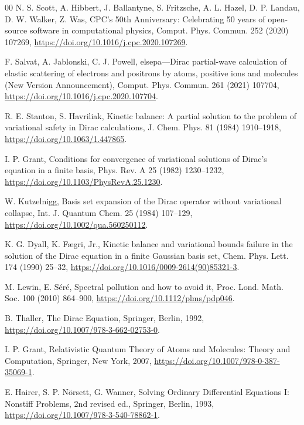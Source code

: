 \documentclass[a4paper,fleqn]{cas-dc}
\begin{document}
\begin{thebibliography}{00}
 N. S. Scott, A. Hibbert, J. Ballantyne, S. Fritzsche, A. L. Hazel, D. P. Landau, D. W. Walker, Z. Was, CPC's 50th Anniversary: Celebrating 50 years of open-source software in computational physics, Comput. Phys. Commun. 252 (2020) 107269, \url{https://doi.org/10.1016/j.cpc.2020.107269}.

 F. Salvat, A. Jablonski, C. J. Powell, elsepa---Dirac partial-wave calculation of elastic scattering of electrons and positrons by atoms, positive ions and molecules (New Version Announcement), Comput. Phys. Commun. 261 (2021) 107704, \url{https://doi.org/10.1016/j.cpc.2020.107704}.

 R. E. Stanton, S. Havriliak, Kinetic balance: A partial solution to the problem of variational safety in Dirac calculations, J. Chem. Phys. 81 (1984) 1910--1918, \url{https://doi.org/10.1063/1.447865}.

 I. P. Grant, Conditions for convergence of variational solutions of Dirac's equation in a finite basis, Phys. Rev. A 25 (1982) 1230--1232, \url{https://doi.org/10.1103/PhysRevA.25.1230}.

 W. Kutzelnigg, Basis set expansion of the Dirac operator without variational collapse, Int. J. Quantum Chem. 25 (1984) 107--129, \url{https://doi.org/10.1002/qua.560250112}.

 K. G. Dyall, K. F\ae gri, Jr., Kinetic balance and variational bounds failure in the solution of the Dirac equation in a finite Gaussian basis set, Chem. Phys. Lett. 174 (1990) 25--32, \url{https://doi.org/10.1016/0009-2614(90)85321-3}.

 M. Lewin, E. S\'er\'e, Spectral pollution and how to avoid it, Proc. Lond. Math. Soc. 100 (2010) 864--900, \url{https://doi.org/10.1112/plms/pdp046}.

 B. Thaller, The Dirac Equation, Springer, Berlin, 1992, \url{https://doi.org/10.1007/978-3-662-02753-0}.

 I. P. Grant, Relativistic Quantum Theory of Atoms and Molecules: Theory and Computation, Springer, New York, 2007, \url{https://doi.org/10.1007/978-0-387-35069-1}.

 E. Hairer, S. P. N\"orsett, G. Wanner, Solving Ordinary Differential Equations I: Nonstiff Problems, 2nd revised ed., Springer, Berlin, 1993, \url{https://doi.org/10.1007/978-3-540-78862-1}.


\end{thebibliography}
\end{document}
